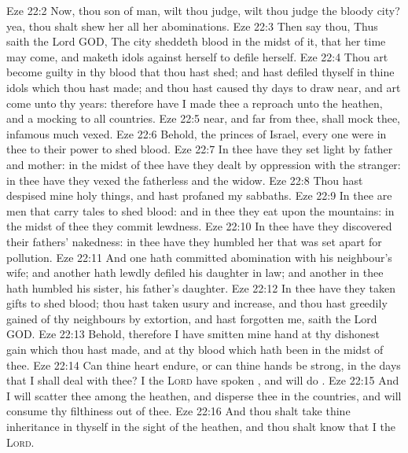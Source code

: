 \vs Eze 22:2 Now, thou son of man, wilt thou judge, wilt thou judge the bloody city? yea, thou shalt shew her all her abominations.
\vs Eze 22:3 Then say thou, Thus saith the Lord GOD, The city sheddeth blood in the midst of it, that her time may come, and maketh idols against herself to defile herself.
\vs Eze 22:4 Thou art become guilty in thy blood that thou hast shed; and hast defiled thyself in thine idols which thou hast made; and thou hast caused thy days to draw near, and art come  unto thy years: therefore have I made thee a reproach unto the heathen, and a mocking to all countries.
\vs Eze 22:5  near, and  far from thee, shall mock thee,  infamous  much vexed.
\vs Eze 22:6 Behold, the princes of Israel, every one were in thee to their power to shed blood.
\vs Eze 22:7 In thee have they set light by father and mother: in the midst of thee have they dealt by oppression with the stranger: in thee have they vexed the fatherless and the widow.
\vs Eze 22:8 Thou hast despised mine holy things, and hast profaned my sabbaths.
\vs Eze 22:9 In thee are men that carry tales to shed blood: and in thee they eat upon the mountains: in the midst of thee they commit lewdness.
\vs Eze 22:10 In thee have they discovered their fathers' nakedness: in thee have they humbled her that was set apart for pollution.
\vs Eze 22:11 And one hath committed abomination with his neighbour's wife; and another hath lewdly defiled his daughter in law; and another in thee hath humbled his sister, his father's daughter.
\vs Eze 22:12 In thee have they taken gifts to shed blood; thou hast taken usury and increase, and thou hast greedily gained of thy neighbours by extortion, and hast forgotten me, saith the Lord GOD.
\vs Eze 22:13 Behold, therefore I have smitten mine hand at thy dishonest gain which thou hast made, and at thy blood which hath been in the midst of thee.
\vs Eze 22:14 Can thine heart endure, or can thine hands be strong, in the days that I shall deal with thee? I the \textsc{Lord} have spoken , and will do .
\vs Eze 22:15 And I will scatter thee among the heathen, and disperse thee in the countries, and will consume thy filthiness out of thee.
\vs Eze 22:16 And thou shalt take thine inheritance in thyself in the sight of the heathen, and thou shalt know that I  the \textsc{Lord}.
